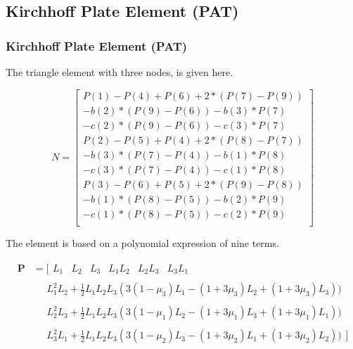 \documentclass[9pt]{beamer}
\begin{document}
\subsection{Kirchhoff Plate Element (PAT)}
\begin{frame}\frametitle{Kirchhoff Plate Element (PAT)}

The triangle element with three nodes, is given here.

\begin{equation*}
N = 
\begin{bmatrix}
                 P(1)-P(4)+P(6)+2*(P(7)-P(9))\\
                 -b(2)*(P(9)-P(6))-b(3)*P(7)\\
                 -c(2)*(P(9)-P(6))-c(3)*P(7)\\
                 P(2)-P(5)+P(4)+2*(P(8)-P(7))\\
                 -b(3)*(P(7)-P(4))-b(1)*P(8)\\
                 -c(3)*(P(7)-P(4))-c(1)*P(8)\\
                 P(3)-P(6)+P(5)+2*(P(9)-P(8))\\
                -b(1)*(P(8)-P(5))-b(2)*P(9)\\
                -c(1)*(P(8)-P(5))-c(2)*P(9)\\
\end{bmatrix}
\end{equation*}

 The element is based on a polynomial expression of nine terms.
 

\begin{equation*}\label{eq:poly}
\begin{split}
\textbf{P} & = [
\begin{matrix}
L_1
&
L_2
&
L_3
&
L_1 L_2
&
L_2 L_3
&
L_3 L_1
\end{matrix} \\
& \quad
\begin{matrix}
L_1^2L_2+\frac{1}{2}L_1L_2L_3(3(1-\mu_3)L_1-(1+3\mu_3)L_2+(1+3\mu_3)L_3) )
\end{matrix}\\
& \quad
\begin{matrix}
L_2^2L_3+\frac{1}{2}L_1L_2L_3(3(1-\mu_1)L_2-(1+3\mu_1)L_3+(1+3\mu_1)L_1) )
\end{matrix}\\
& \quad
\begin{matrix}
L_3^2L_1+\frac{1}{2}L_1L_2L_3(3(1-\mu_2)L_3-(1+3\mu_2)L_1+(1+3\mu_2)L_2) )
\end{matrix} ]
\end{split}
\end{equation*}


\end{frame}
\end{document}

